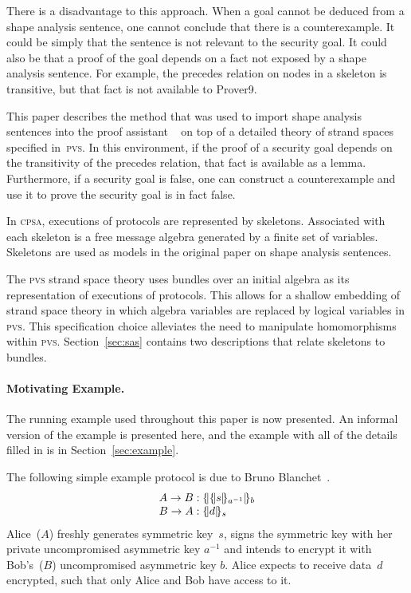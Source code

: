 \documentclass[titlepage,12pt]{article}
\newcommand{\cpsa}{\textsc{cpsa}}
\newcommand{\pvs}{\textsc{pvs}}
\newcommand{\enc}[2]{\ensuremath{\{\!|#1|\!\}_{#2}}}
\newcommand{\invk}[1]{{#1}^{-1}}
\begin{document}
There is a disadvantage to this approach.  When a goal cannot be
deduced from a shape analysis sentence, one cannot conclude that there
is a counterexample.  It could be simply that the sentence is not
relevant to the security goal.  It could also be that a proof of the
goal depends on a fact not exposed by a shape analysis sentence.  For
example, the precedes relation on nodes in a skeleton is transitive,
but that fact is not available to Prover9.

This paper describes the method that was used to import shape analysis
sentences into the proof assistant
\index{PVS@\pvs}{\pvs}~\cite{cade92-pvs} on top of a detailed theory
of strand spaces specified in~{\pvs}.  In this environment, if the
proof of a security goal depends on the transitivity of the precedes
relation, that fact is available as a lemma.  Furthermore, if a
security goal is false, one can construct a counterexample and use it
to prove the security goal is in fact false.

In {\cpsa}, executions of protocols are represented by skeletons.
Associated with each skeleton is a free message algebra generated by a
finite set of variables.  Skeletons are used as models in the original
paper on shape analysis sentences.

The {\pvs} strand space theory uses bundles over an initial algebra as
its representation of executions of protocols.  This allows for a
shallow embedding of strand space theory in which algebra variables
are replaced by logical variables in {\pvs}.  This specification
choice alleviates the need to manipulate homomorphisms within {\pvs}.
Section~\ref{sec:sas} contains two descriptions that relate skeletons
to bundles.

\paragraph{Motivating Example.}

The running example used throughout this paper is now presented.  An
informal version of the example is presented here, and the example
with all of the details filled in is in Section~\ref{sec:example}.

The following simple example protocol is due to Bruno
Blanchet~\cite{BlanchetHDR}.
$$\begin{array}{r@{{}:{}}l}
A\to B&\enc{\enc{s}{\invk{a}}}{b}\\
B\to A&\enc{d}{s}
\end{array}$$
Alice~($A$) freshly generates symmetric key~$s$, signs the symmetric
key with her private uncompromised asymmetric key $\invk{a}$ and intends
to encrypt it with Bob's~($B$) uncompromised asymmetric key $b$.
Alice expects to receive data~$d$ encrypted, such that only Alice and
Bob have access to it.
\end{document}
